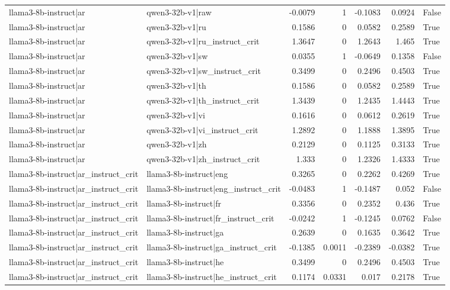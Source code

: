 \begin{table}
\begin{tabular}{l l r r r r l}
llama3-8b-instruct|ar & qwen3-32b-v1|raw & -0.0079 & 1 & -0.1083 & 0.0924 & False \\
llama3-8b-instruct|ar & qwen3-32b-v1|ru & 0.1586 & 0 & 0.0582 & 0.2589 & True \\
llama3-8b-instruct|ar & qwen3-32b-v1|ru_instruct_crit & 1.3647 & 0 & 1.2643 & 1.465 & True \\
llama3-8b-instruct|ar & qwen3-32b-v1|sw & 0.0355 & 1 & -0.0649 & 0.1358 & False \\
llama3-8b-instruct|ar & qwen3-32b-v1|sw_instruct_crit & 0.3499 & 0 & 0.2496 & 0.4503 & True \\
llama3-8b-instruct|ar & qwen3-32b-v1|th & 0.1586 & 0 & 0.0582 & 0.2589 & True \\
llama3-8b-instruct|ar & qwen3-32b-v1|th_instruct_crit & 1.3439 & 0 & 1.2435 & 1.4443 & True \\
llama3-8b-instruct|ar & qwen3-32b-v1|vi & 0.1616 & 0 & 0.0612 & 0.2619 & True \\
llama3-8b-instruct|ar & qwen3-32b-v1|vi_instruct_crit & 1.2892 & 0 & 1.1888 & 1.3895 & True \\
llama3-8b-instruct|ar & qwen3-32b-v1|zh & 0.2129 & 0 & 0.1125 & 0.3133 & True \\
llama3-8b-instruct|ar & qwen3-32b-v1|zh_instruct_crit & 1.333 & 0 & 1.2326 & 1.4333 & True \\
llama3-8b-instruct|ar_instruct_crit & llama3-8b-instruct|eng & 0.3265 & 0 & 0.2262 & 0.4269 & True \\
llama3-8b-instruct|ar_instruct_crit & llama3-8b-instruct|eng_instruct_crit & -0.0483 & 1 & -0.1487 & 0.052 & False \\
llama3-8b-instruct|ar_instruct_crit & llama3-8b-instruct|fr & 0.3356 & 0 & 0.2352 & 0.436 & True \\
llama3-8b-instruct|ar_instruct_crit & llama3-8b-instruct|fr_instruct_crit & -0.0242 & 1 & -0.1245 & 0.0762 & False \\
llama3-8b-instruct|ar_instruct_crit & llama3-8b-instruct|ga & 0.2639 & 0 & 0.1635 & 0.3642 & True \\
llama3-8b-instruct|ar_instruct_crit & llama3-8b-instruct|ga_instruct_crit & -0.1385 & 0.0011 & -0.2389 & -0.0382 & True \\
llama3-8b-instruct|ar_instruct_crit & llama3-8b-instruct|he & 0.3499 & 0 & 0.2496 & 0.4503 & True \\
llama3-8b-instruct|ar_instruct_crit & llama3-8b-instruct|he_instruct_crit & 0.1174 & 0.0331 & 0.017 & 0.2178 & True \\

\end{tabular}
\end{table}
